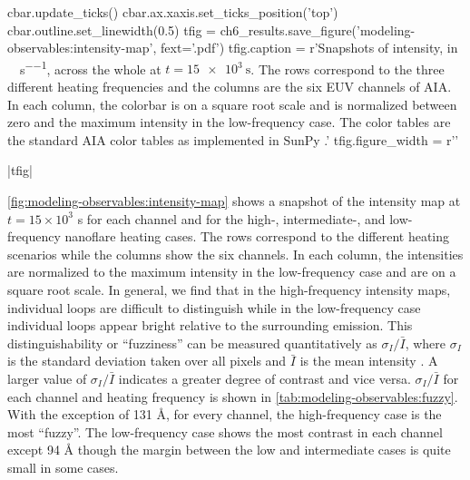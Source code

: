 \begin{pycode}
            cbar.update_ticks()
            cbar.ax.xaxis.set_ticks_position('top')
            cbar.outline.set_linewidth(0.5)
tfig = ch6_results.save_figure('modeling-observables:intensity-map', fext='.pdf')
tfig.caption = r'Snapshots of intensity, in \si{\dn\per\pixel\per\second}, across the whole \AR{} at $t=\SI{15e3}{\second}$. The rows correspond to the three different heating frequencies and the columns are the six EUV channels of AIA. In each column, the colorbar is on a square root scale and is normalized between zero and the maximum intensity in the low-frequency case. The color tables are the standard AIA color tables as implemented in SunPy \citep{sunpy_community_sunpypython_2015}.'
tfig.figure_width = r'\textwidth'
\end{pycode}
|tfig|

\autoref{fig:modeling-observables:intensity-map} shows a snapshot of the intensity map at $t=15\times10^3$ s for each channel and for the high-, intermediate-, and low-frequency nanoflare heating cases. The rows correspond to the different heating scenarios while the columns show the six channels. In each column, the intensities are normalized to the maximum intensity in the low-frequency case and are on a square root scale. In general, we find that in the high-frequency intensity maps, individual loops are difficult to distinguish while in the low-frequency case individual loops appear bright relative to the surrounding emission. This distinguishability or ``fuzziness'' can be measured quantitatively as $\sigma_{I}/\bar{I}$, where $\sigma_{I}$ is the standard deviation taken over all pixels and $\bar{I}$ is the mean intensity \citep[Equation 11]{guarrasi_coronal_2010}. A larger value of $\sigma_{I}/\bar{I}$ indicates a greater degree of contrast and vice versa. $\sigma_{I}/\bar{I}$ for each channel and heating frequency is shown in \autoref{tab:modeling-observables:fuzzy}. With the exception of 131 \AA{}, for every channel, the high-frequency case is the most ``fuzzy''. The low-frequency case shows the most contrast in each channel except 94 \AA{} though the margin between the low and intermediate cases is quite small in some cases.

